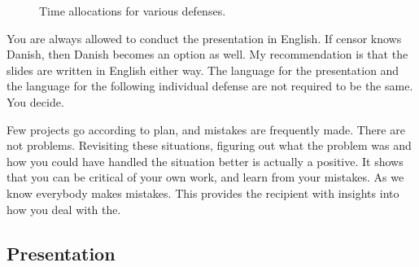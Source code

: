 \documentclass[a4paper, oneside]{memoir}
\newcommand{\idx}[1]{\index{#1}\marginpar{\raggedright \tiny #1}}
\begin{document}
\begin{figure}
  \centering
  \caption{\label{fig:defense:time} Time allocations for various defenses.}
\end{figure}

You are always allowed to conduct the presentation in English. If censor knows Danish, then Danish becomes an option as well. My recommendation is that the slides are written in English either way. The language for the presentation and the language for the following individual defense are not required to be the same. You decide.

Few projects go according to plan, and mistakes\idx{Mistakes} are frequently made. There are not problems. Revisiting these situations, figuring out what the problem was and how you could have handled the situation better is actually a positive. It shows that you can be critical of your own work, and learn from your mistakes. As we know everybody makes mistakes. This provides the recipient with insights into how you deal with the.

\subsection{Presentation}
\end{document}
